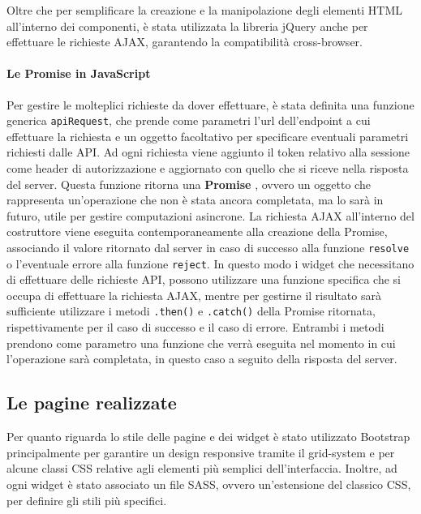 Oltre che per semplificare la creazione e la manipolazione degli elementi HTML
all'interno dei componenti, è stata utilizzata la libreria jQuery \cite{jquery}
anche per effettuare le richieste AJAX, garantendo la compatibilità cross-browser.

\paragraph{Le Promise in JavaScript}
Per gestire le molteplici richieste da dover effettuare, è stata definita una
funzione generica \texttt{apiRequest}, che prende come parametri l'url dell'endpoint
a cui effettuare la richiesta e un oggetto facoltativo per specificare eventuali
parametri richiesti dalle API. Ad ogni richiesta viene aggiunto il token relativo
alla sessione come header di autorizzazione e aggiornato con quello che si riceve
nella risposta del server.
Questa funzione ritorna una \textbf{Promise} \cite{mdn:promise}, ovvero un oggetto
che rappresenta un'operazione che non è stata ancora completata, ma lo sarà in futuro,
utile per gestire computazioni asincrone. La richiesta AJAX all'interno del costruttore
viene eseguita contemporaneamente alla creazione della Promise, associando il valore
ritornato dal server in caso di successo alla funzione \texttt{resolve} o l'eventuale
errore alla funzione \texttt{reject}.
In questo modo i widget che necessitano di effettuare delle richieste API,
possono utilizzare una funzione specifica che si occupa di effettuare la richiesta
AJAX, mentre per gestirne il risultato sarà sufficiente utilizzare i metodi
\texttt{.then()} e \texttt{.catch()} della Promise ritornata, rispettivamente per
il caso di successo e il caso di errore. Entrambi i metodi
prendono come parametro una funzione che verrà eseguita nel momento in cui
l'operazione sarà completata, in questo caso a seguito della risposta del server.




\subsection{Le pagine realizzate}
Per quanto riguarda lo stile delle pagine e dei widget è stato utilizzato Bootstrap
principalmente per garantire un design responsive tramite il grid-system \cite{bootstrap:grid}
e per alcune classi CSS relative agli elementi più semplici dell'interfaccia.
Inoltre, ad ogni widget è stato associato un file SASS, ovvero un'estensione del
classico CSS, per definire gli stili più specifici.

